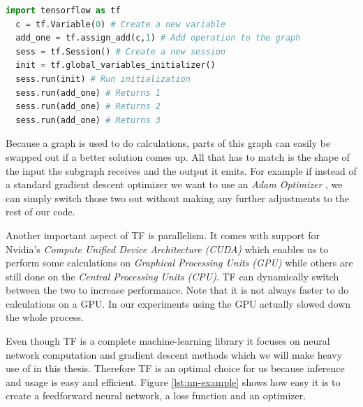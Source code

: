 \begin{minipage}{\linewidth}
\begin{lstlisting}[language=Python, caption=Python code for TF variables, captionpos=b, label=lst:tf-var]
  import tensorflow as tf
  c = tf.Variable(0) # Create a new variable
  add_one = tf.assign_add(c,1) # Add operation to the graph
  sess = tf.Session() # Create a new session
  init = tf.global_variables_initializer()
  sess.run(init) # Run initialization
  sess.run(add_one) # Returns 1
  sess.run(add_one) # Returns 2
  sess.run(add_one) # Returns 3
\end{lstlisting}
\end{minipage}


Because a graph is used to do calculations, parts of this graph can easily be swapped out if a better solution comes up.
All that has to match is the shape of the input the subgraph receives and the output it emits.
For example if instead of a standard gradient descent optimizer we want to use an \emph{Adam Optimizer} \cite{adam_optimizer}, we can simply switch those two out without making any further adjustments to the rest of our code.


Another important aspect of TF is parallelism. It comes with support for Nvidia's \emph{Compute Unified Device Architecture (CUDA)} which enables us to perform some calculations on \emph{Graphical Processing Units (GPU)} while others are still done on the \emph{Central Processing Units (CPU)}.
TF can dynamically switch between the two to increase performance.
Note that it is not always faster to do calculations on a GPU.
In our experiments using the GPU actually slowed down the whole process.


Even though TF is a complete machine-learning library it focuses on neural network computation and gradient descent methods which we will make heavy use of in this thesis.
Therefore TF is an optimal choice for us because inference and usage is easy and efficient.
Figure \ref{lst:nn-example} shows how easy it is to create a feedforward neural network, a loss function and an optimizer.

